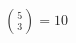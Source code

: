\documentclass[preview]{standalone}
\begin{document}
\begin{align*}
{5 \choose 3} = 10
\end{align*}
\end{document}
